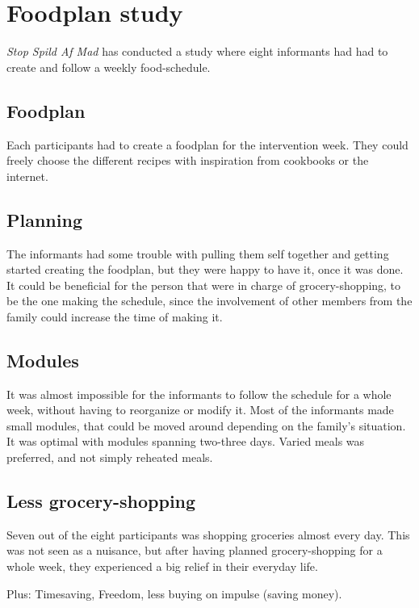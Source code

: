 \section{Foodplan study}
\textit{Stop Spild Af Mad} has conducted a study where eight informants had had to create and follow a weekly food-schedule.

\subsection{Foodplan}
Each participants had to create a foodplan for the intervention week. They could freely choose the different recipes with inspiration from cookbooks or the internet.

\subsection{Planning}
The informants had some trouble with pulling them self together and getting started creating the foodplan, but they were happy to have it, once it was done. It could be beneficial for the person that were in charge of grocery-shopping, to be the one making the schedule, since the involvement of other members from the family could increase the time of making it.

\subsection{Modules}
It was almost impossible for the informants to follow the schedule for a whole week, without having to reorganize or modify it. Most of the informants made small modules, that could be moved around depending on the family's situation. It was optimal with modules spanning two-three days. Varied meals was preferred, and not simply reheated meals.

\subsection{Less grocery-shopping}
Seven out of the eight participants was shopping groceries almost every day. This was not seen as a nuisance, but after having planned grocery-shopping for a whole week, they experienced a big relief in their everyday life.

Plus: Timesaving, Freedom, less buying on impulse (saving money).


